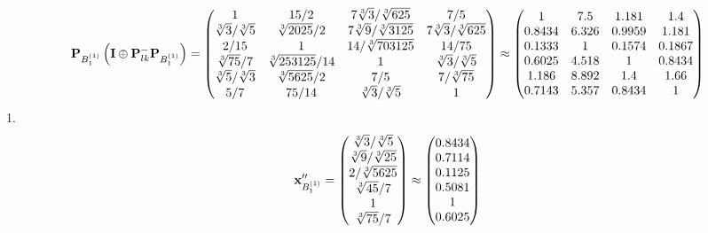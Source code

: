 \documentclass[10pt,a4paper]{article}
\begin{document}
	\[
		\bold{P}_{B_1^{(1)}}\left(\bold{I} \oplus \bold{P}_{lk}^{-}\bold{P}_{B_1^{(1)}}\right) = 
		\begin{pmatrix}
			{1}{} & {{15}} / {{2}} & {{7}\sqrt[3]{3}} / {\sqrt[3]{625}} & {{7}} / {{5}} \\
			{\sqrt[3]{3}} / {\sqrt[3]{5}} & {\sqrt[3]{2025}} / {{2}} & {{7}\sqrt[3]{9}} / {\sqrt[3]{3125}} & {{7}\sqrt[3]{3}} / {\sqrt[3]{625}} \\
			{{2}} / {{15}} & {1}{} & {{14}} / {\sqrt[3]{703125}} & {{14}} / {{75}} \\
			{\sqrt[3]{75}} / {{7}} & {\sqrt[3]{253125}} / {{14}} & {1}{} & {\sqrt[3]{3}} / {\sqrt[3]{5}} \\
			{\sqrt[3]{5}} / {\sqrt[3]{3}} & {\sqrt[3]{5625}} / {{2}} & {{7}} / {{5}} & {{7}} / {\sqrt[3]{75}} \\
			{{5}} / {{7}} & {{75}} / {{14}} & {\sqrt[3]{3}} / {\sqrt[3]{5}} & {1}{} \\
		\end{pmatrix}
		\approx
		\begin{pmatrix}
			1        & 7.5      & 1.181    & 1.4      \\
			0.8434   & 6.326    & 0.9959   & 1.181    \\
			0.1333   & 1        & 0.1574   & 0.1867   \\
			0.6025   & 4.518    & 1        & 0.8434   \\
			1.186    & 8.892    & 1.4      & 1.66     \\
			0.7143   & 5.357    & 0.8434   & 1        \\
		\end{pmatrix}
	\]
	1.
	\[
		\bold{x}''_{B_1^{(1)}} = 
		\begin{pmatrix}
			{\sqrt[3]{3}} / {\sqrt[3]{5}} \\
			{\sqrt[3]{9}} / {\sqrt[3]{25}} \\
			{{2}} / {\sqrt[3]{5625}} \\
			{\sqrt[3]{45}} / {{7}} \\
			{1}{} \\
			{\sqrt[3]{75}} / {{7}} \\
		\end{pmatrix}
		\approx
		\begin{pmatrix}
			0.8434   \\
			0.7114   \\
			0.1125   \\
			0.5081   \\
			1        \\
			0.6025   \\
		\end{pmatrix}
	\]
\end{document}
